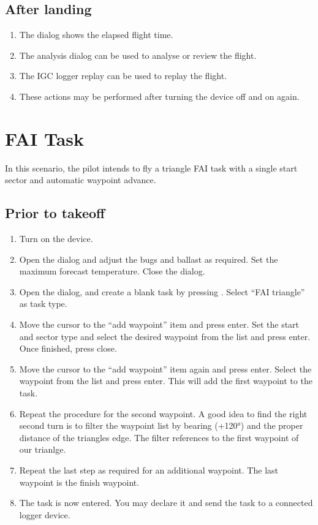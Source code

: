 \documentclass[a4paper,12pt]{refrep}
\begin{document}
\subsection*{After landing}
\begin{enumerate}
\item  The  dialog shows the elapsed flight time.
\item  The analysis dialog can be used to analyse or review the flight.
\item  The IGC logger replay can be used to replay the flight.
\item  These actions may be performed after turning the device off and 
  on again. 
\end{enumerate}

\section{FAI Task}\label{sec:fai-task}

In this scenario, the pilot intends to fly a triangle FAI task with a
single start sector and automatic waypoint advance.

\subsection*{Prior to takeoff}
\begin{enumerate}
\item  Turn on the device.
\item  Open the  dialog and adjust the bugs and ballast as
required. Set the maximum forecast temperature.  Close the dialog.
\item  Open the  dialog, and create a blank task by pressing
. Select ``FAI triangle'' as task type.
\item  Move the cursor to the ``add waypoint'' item and press enter.  Set the
start and sector type and select the desired waypoint from the list and press enter.  Once finished, press close.
\item  Move the cursor to the ``add waypoint'' item again and press enter. 
Select the waypoint from the list and press enter.  This will add the first waypoint to the task.
\item  Repeat the procedure for the second waypoint. A good idea to find the
right second turn is to filter the waypoint list by bearing (+120°) and the
proper distance of the triangles edge. The filter references to
the first waypoint of our trianlge.
\item  Repeat the last step as required for an additional waypoint.  The last
waypoint is the finish waypoint.
\item  The task is now entered.  You may declare it and send the task to a
connected logger device.
\end{enumerate}
\end{document}
